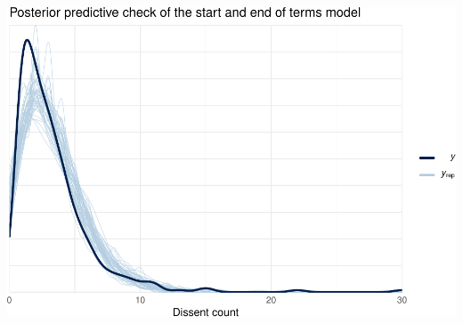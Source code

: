 \documentclass[
  11pt,
]{article}
\begin{document}
\includegraphics{dissents_article_appendix_files/figure-latex/posterior_check_term-1.pdf}
\end{document}
